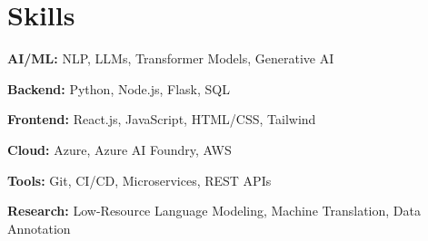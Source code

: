 \documentclass[letterpaper,10pt]{article}
\newenvironment{resume_list}{
  \vspace{-7pt}
  \begin{itemize}[itemsep=-2px, parsep=1pt, leftmargin=30pt]
}{
  \end{itemize}
}
\begin{document}
\section{Skills}

\begin{resume_list}
  \item \textbf{AI/ML:} NLP, LLMs, Transformer Models, Generative AI
  \item \textbf{Backend:} Python, Node.js, Flask, SQL
  \item \textbf{Frontend:} React.js, JavaScript, HTML/CSS, Tailwind
  \item \textbf{Cloud:} Azure, Azure AI Foundry, AWS
  \item \textbf{Tools:} Git, CI/CD, Microservices, REST APIs
  \item \textbf{Research:} Low-Resource Language Modeling, Machine Translation, Data Annotation
\end{resume_list}
\end{document}
